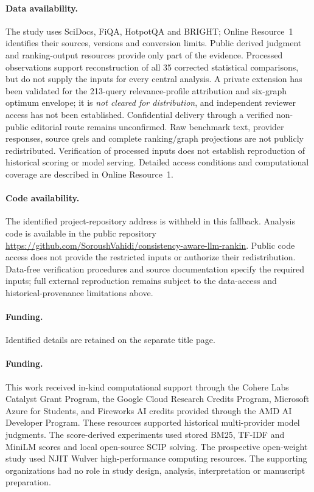 \paragraph{Data availability.}
The study uses SciDocs, FiQA, HotpotQA and BRIGHT; Online Resource~1 identifies their sources, versions and conversion limits. Public derived judgment and ranking-output resources provide only part of the evidence. Processed observations support reconstruction of all 35 corrected statistical comparisons, but do not supply the inputs for every central analysis. A private extension has been validated for the 213-query relevance-profile attribution and six-graph optimum envelope; it is \emph{not cleared for distribution}, and independent reviewer access has not been established. Confidential delivery through a verified non-public editorial route remains unconfirmed. Raw benchmark text, provider responses, source qrels and complete ranking/graph projections are not publicly redistributed. Verification of processed inputs does not establish reproduction of historical scoring or model serving. Detailed access conditions and computational coverage are described in Online Resource~1.
\paragraph{Code availability.}
\ifdefined\AnonymousVersion
The identified project-repository address is withheld in this fallback.
\else
Analysis code is available in the public repository \url{https://github.com/SoroushVahidi/consistency-aware-llm-rankin}.
\fi
Public code access does not provide the restricted inputs or authorize their redistribution. Data-free verification procedures and source documentation specify the required inputs; full external reproduction remains subject to the data-access and historical-provenance limitations above.

\ifdefined\AnonymousVersion
\paragraph{Funding.} Identified details are retained on the separate title page.
\else
\paragraph{Funding.}
This work received in-kind computational support through the Cohere Labs Catalyst Grant Program, the Google Cloud Research Credits Program, Microsoft Azure for Students, and Fireworks AI credits provided through the AMD AI Developer Program. These resources supported historical multi-provider model judgments. The score-derived experiments used stored BM25, TF-IDF and MiniLM scores and local open-source SCIP solving. The prospective open-weight study used NJIT Wulver high-performance computing resources. The supporting organizations had no role in study design, analysis, interpretation or manuscript preparation.
\fi
